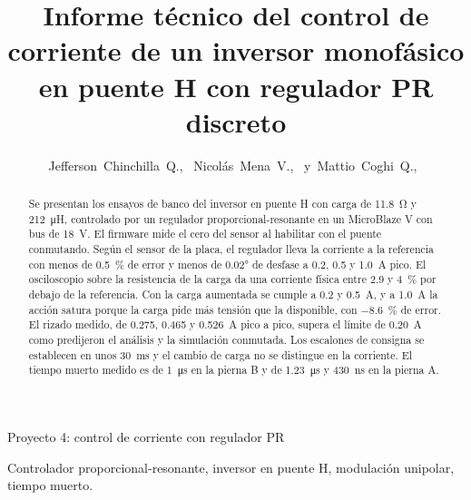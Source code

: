 \documentclass[journal]{IEEEtran}
\begin{document}
\deactivatequoting
\title{Informe técnico del control de corriente de un inversor monofásico en puente H con regulador PR discreto}

\author{Jefferson~Chinchilla~Q.,~
	Nicolás~Mena~V.,~
	y~Mattio~Coghi~Q.,~
}

%
{Proyecto 4: control de corriente con regulador PR}

\maketitle

\begin{abstract}
	\boldmath\DeclareSIUnit{\ohm}{\ensuremath{\Omega}}
	Se presentan los ensayos de banco del inversor en puente H con carga de \SI{11.8}{\ohm} y \SI{212}{\micro H}, controlado por un regulador proporcional-resonante en un MicroBlaze V con bus de \SI{18}{V}. El firmware mide el cero del sensor al habilitar con el puente conmutando. Según el sensor de la placa, el regulador lleva la corriente a la referencia con menos de \SI{0.5}{\percent} de error y menos de \ang{0.02} de desfase a \num{0.2}, \num{0.5} y \SI{1.0}{A} pico. El osciloscopio sobre la resistencia de la carga da una corriente física entre \num{2.9} y \SI{4}{\percent} por debajo de la referencia. Con la carga aumentada se cumple a \num{0.2} y \SI{0.5}{A}, y a \SI{1.0}{A} la acción satura porque la carga pide más tensión que la disponible, con \SI{-8.6}{\percent} de error. El rizado medido, de \num{0.275}, \num{0.465} y \SI{0.526}{A} pico a pico, supera el límite de \SI{0.20}{A} como predijeron el análisis y la simulación conmutada. Los escalones de consigna se establecen en unos \SI{30}{ms} y el cambio de carga no se distingue en la corriente. El tiempo muerto medido es de \SI{1}{\micro s} en la pierna B y de \SI{1.23}{\micro s} y \SI{430}{ns} en la pierna A.
\end{abstract}


\begin{IEEEkeywords}
	Controlador proporcional-resonante, inversor en puente H, modulación unipolar, tiempo muerto.
\end{IEEEkeywords}
\end{document}
